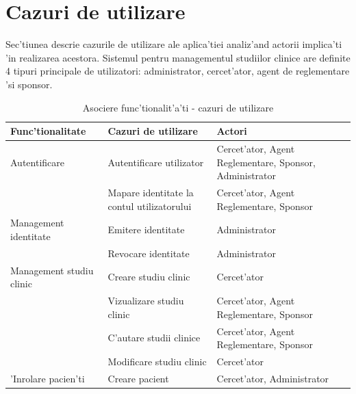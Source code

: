 \documentclass[12pt,a4paper,twoside]{report}
\begin{document}
\section{Cazuri de utilizare}
Sec'tiunea descrie cazurile de utilizare ale aplica'tiei analiz'and actorii implica'ti 'in realizarea acestora. Sistemul pentru managementul studiilor clinice are definite 4 tipuri principale de utilizatori: administrator, cercet'ator, agent de reglementare 'si sponsor.
\begin{longtable}{|p{5cm}|p{5.3cm}|p{5.1cm}|}
\caption{Asociere func'tionalit'a'ti - cazuri de utilizare}
\label{uc-table}
\endfirsthead
\endhead
\hline
\hline
Func'tionalitate          & Cazuri de utilizare                        & Actori                                                 \\ \hline
Autentificare            & Autentificare utilizator                   & Cercet'ator, Agent Reglementare, Sponsor, Administrator \\ \cline{2-3} 
                         & Mapare identitate la contul utilizatorului & Cercet'ator, Agent Reglementare, Sponsor                \\ \hline
Management identitate    & Emitere identitate                         & Administrator                                          \\ \cline{2-3} 
                         & Revocare identitate                        & Administrator                                          \\ \hline
Management studiu clinic & Creare studiu clinic                       & Cercet'ator                                             \\ \cline{2-3} 
                         & Vizualizare studiu clinic                  & Cercet'ator, Agent Reglementare, Sponsor                \\ \cline{2-3} 
                         & C'autare studii clinice                     & Cercet'ator, Agent Reglementare, Sponsor                \\ \cline{2-3} 
                         & Modificare studiu clinic                   & Cercet'ator                                             \\ \hline
'Inrolare pacien'ti        & Creare pacient                             & Cercet'ator, Administrator                              \\ \cline{2-3} 

\end{longtable}
\end{document}

